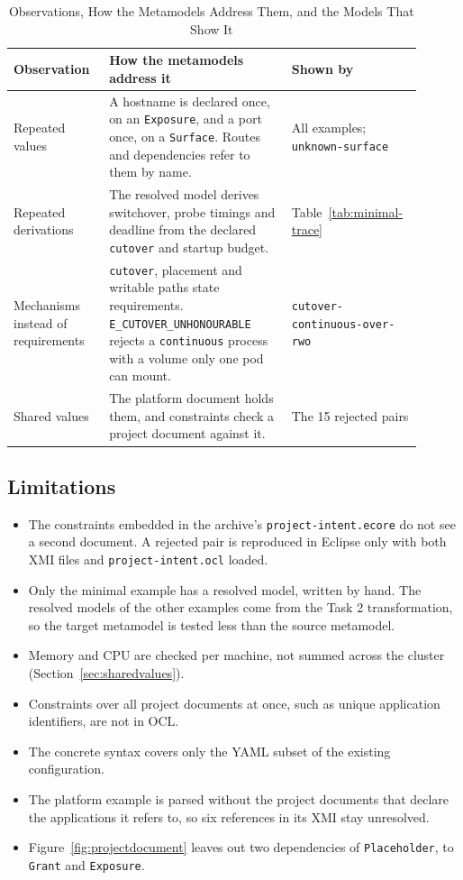 \begin{table}[!htbp]
\centering
\footnotesize
\begin{tabular}{>{\raggedright\arraybackslash}p{0.22\linewidth}>{\raggedright\arraybackslash}p{0.42\linewidth}>{\raggedright\arraybackslash}p{0.26\linewidth}}
\hline
\textbf{Observation} & \textbf{How the metamodels address it} & \textbf{Shown by} \\
\hline
Repeated values & A hostname is declared once, on an \texttt{Exposure}, and a port once, on a \texttt{Surface}. Routes and dependencies refer to them by name. & All examples; \texttt{unknown-surface} \\
Repeated derivations & The resolved model derives switchover, probe timings and deadline from the declared \texttt{cutover} and startup budget. & Table~\ref{tab:minimal-trace} \\
Mechanisms instead of requirements & \texttt{cutover}, placement and writable paths state requirements. \texttt{E\_CUTOVER\_UNHONOURABLE} rejects a \texttt{continuous} process with a volume only one pod can mount. & \texttt{cutover-continuous-over-rwo} \\
Shared values & The platform document holds them, and constraints check a project document against it. & The 15 rejected pairs \\
\hline
\end{tabular}
\caption{Observations, How the Metamodels Address Them, and the Models That Show It}
\label{tab:evaluation}
\end{table}

\subsection{Limitations}
\label{sec:limitations}

\begin{itemize}
  \item The constraints embedded in the archive's \texttt{project-intent.ecore}
    do not see a second document. A rejected pair is reproduced in Eclipse only
    with both XMI files and \texttt{project-intent.ocl} loaded.
  \item Only the minimal example has a resolved model, written by hand. The
    resolved models of the other examples come from the Task 2 transformation,
    so the target metamodel is tested less than the source metamodel.
  \item Memory and CPU are checked per machine, not summed across the cluster
    (Section~\ref{sec:sharedvalues}).
  \item Constraints over all project documents at once, such as unique
    application identifiers, are not in OCL.
  \item The concrete syntax covers only the YAML subset of the existing
    configuration.
  \item The platform example is parsed without the project documents that
    declare the applications it refers to, so six references in its XMI stay
    unresolved.
  \item Figure~\ref{fig:projectdocument} leaves out two dependencies of
    \texttt{Placeholder}, to \texttt{Grant} and \texttt{Exposure}.
\end{itemize}

